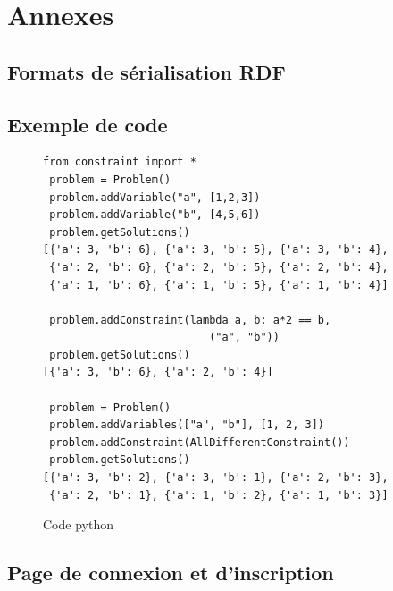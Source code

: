 \newpage
\chapter*{Annexes}

\setcounter{page}{1}



\section{Formats de sérialisation RDF}
\label{annexe/serialisation}





\newpage


\section{Exemple de code}
\label{annexe/espace_nom}

\begin{figure}[!h]
\begin{lstlisting}[frame=single]
 from constraint import *
 problem = Problem()
 problem.addVariable("a", [1,2,3])
 problem.addVariable("b", [4,5,6])
 problem.getSolutions()
[{'a': 3, 'b': 6}, {'a': 3, 'b': 5}, {'a': 3, 'b': 4},
 {'a': 2, 'b': 6}, {'a': 2, 'b': 5}, {'a': 2, 'b': 4},
 {'a': 1, 'b': 6}, {'a': 1, 'b': 5}, {'a': 1, 'b': 4}]

 problem.addConstraint(lambda a, b: a*2 == b,
                          ("a", "b"))
 problem.getSolutions()
[{'a': 3, 'b': 6}, {'a': 2, 'b': 4}]

 problem = Problem()
 problem.addVariables(["a", "b"], [1, 2, 3])
 problem.addConstraint(AllDifferentConstraint())
 problem.getSolutions()
[{'a': 3, 'b': 2}, {'a': 3, 'b': 1}, {'a': 2, 'b': 3},
 {'a': 2, 'b': 1}, {'a': 1, 'b': 2}, {'a': 1, 'b': 3}]
\end{lstlisting}
\caption{Code python}
\end{figure}

\newpage


\section{Page de connexion et d'inscription}
\label{annexe/espace_nom}

